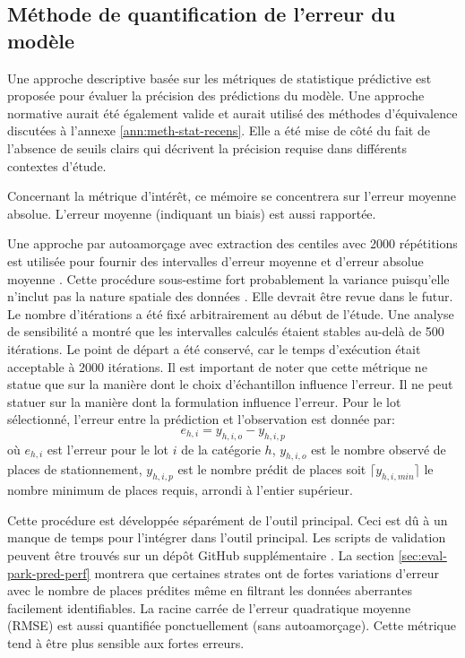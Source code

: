     \subsection{Méthode de quantification de l'erreur du modèle}
        Une approche descriptive basée sur les métriques de statistique prédictive est proposée pour évaluer la précision des prédictions du modèle. Une approche normative aurait été également valide et aurait utilisé des méthodes d'équivalence discutées à l'annexe \ref{ann:meth-stat-recens}. Elle a été mise de côté du fait de l'absence de seuils clairs qui décrivent la précision requise dans différents contextes d'étude.\par
        Concernant la métrique d'intérêt, ce mémoire se concentrera sur l'erreur moyenne absolue. L'erreur moyenne (indiquant un biais) est aussi rapportée. \par
        Une approche par autoamorçage avec extraction des centiles avec 2000 répétitions est utilisée pour fournir des intervalles d'erreur moyenne et d'erreur absolue moyenne . Cette procédure sous-estime fort probablement la variance puisqu'elle n'inclut pas la nature spatiale des données \parencite{castillo-paez_nonparametric_2019}. Elle devrait être revue dans le futur. Le nombre d'itérations a été fixé arbitrairement au début de l'étude. Une analyse de sensibilité a montré que les intervalles calculés étaient stables au-delà de 500 itérations. Le point de départ a été conservé, car le temps d'exécution était acceptable à 2000 itérations. Il est important de noter que cette métrique ne statue que sur la manière dont le choix d'échantillon influence l'erreur. Il ne peut statuer sur la manière dont la formulation influence l'erreur. Pour le lot sélectionné, l'erreur entre la prédiction et l'observation est donnée par:
        \begin{equation}
            e_{h,i} = y_{h,i,o} - y_{h,i,p}
        \end{equation}
        où $e_{h,i}$ est l'erreur pour le lot $i$ de la catégorie $h$, $y_{h,i,o}$ est le nombre observé de places de stationnement,  $y_{h,i,p}$ est le nombre prédit de places soit $\lceil y_{h,i,min} \rceil$ le nombre minimum de places requis, arrondi à l'entier supérieur. 
       
        Cette procédure est développée séparément de l'outil principal. Ceci est dû à un manque de temps pour l'intégrer dans l'outil principal. Les scripts de validation peuvent être trouvés sur un dépôt GitHub supplémentaire \parencite{charbonneau_epmpaulpolyerror_propagation_2025}. La section \ref{sec:eval-park-pred-perf} montrera que certaines strates ont de fortes variations d'erreur avec le nombre de places prédites même en filtrant les données aberrantes facilement identifiables. La racine carrée de l'erreur quadratique moyenne (RMSE) est aussi quantifiée ponctuellement (sans autoamorçage). Cette métrique tend à être plus sensible aux fortes erreurs.
        
